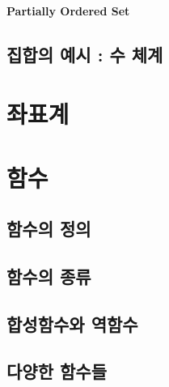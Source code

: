 \paragraph{Partially Ordered Set} 


\subsection{집합의 예시 : 수 체계}



\section{좌표계}

\section{함수}

\subsection{함수의 정의} 


\subsection{함수의 종류} 

\subsection{합성함수와 역함수} 


\subsection{다양한 함수들} 
